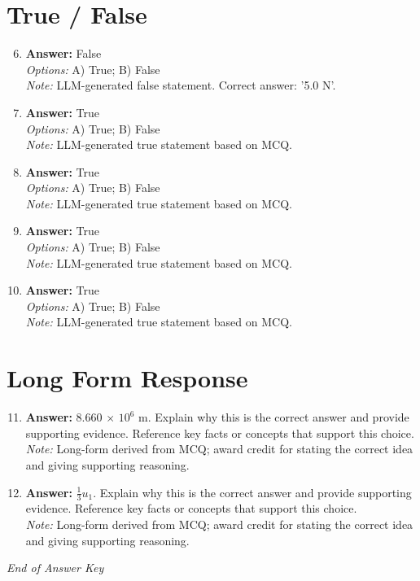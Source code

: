 \documentclass[12pt]{article}
\begin{document}
\section*{True / False}
\begin{enumerate}[label=\arabic*.]
\setcounter{enumi}{5}
\item \textbf{Answer:} False
\\ \textit{Options:} A) True; B) False
\\ \textit{Note:} LLM-generated false statement. Correct answer: '5.0 N'.
\item \textbf{Answer:} True
\\ \textit{Options:} A) True; B) False
\\ \textit{Note:} LLM-generated true statement based on MCQ.
\item \textbf{Answer:} True
\\ \textit{Options:} A) True; B) False
\\ \textit{Note:} LLM-generated true statement based on MCQ.
\item \textbf{Answer:} True
\\ \textit{Options:} A) True; B) False
\\ \textit{Note:} LLM-generated true statement based on MCQ.
\item \textbf{Answer:} True
\\ \textit{Options:} A) True; B) False
\\ \textit{Note:} LLM-generated true statement based on MCQ.
\end{enumerate}

\section*{Long Form Response}
\begin{enumerate}[label=\arabic*.]
\setcounter{enumi}{10}
\item \textbf{Answer:} 8.660 \ensuremath{\times} $10^6$ m. Explain why this is the correct answer and provide supporting evidence. Reference key facts or concepts that support this choice.
\\ \textit{Note:} Long-form derived from MCQ; award credit for stating the correct idea and giving supporting reasoning.
\item \textbf{Answer:} $\frac{1}{3}$$u_1$. Explain why this is the correct answer and provide supporting evidence. Reference key facts or concepts that support this choice.
\\ \textit{Note:} Long-form derived from MCQ; award credit for stating the correct idea and giving supporting reasoning.
\end{enumerate}

\vfill
\noindent\textit{End of Answer Key}
\end{document}
